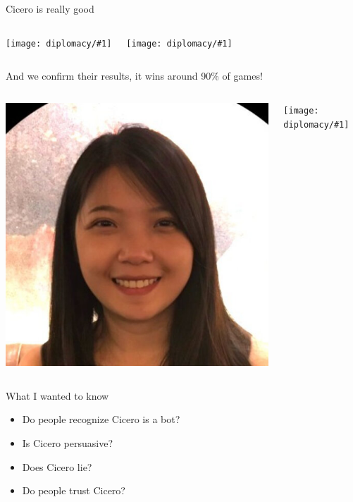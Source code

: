 \documentclass[compress]{beamer}
\newcommand{\gfxd}[2]{
	\begin{center}
		\texttt{[image: diplomacy/\#1]}
	\end{center}
}
\begin{document}

\begin{frame}{Cicero is really good}
	\begin{columns}
		\gfxd{cicero_model}{1.0}
		\gfxd{cicero_results}{1.0}
	\end{columns}
	And we confirm their results, it wins around 90\% of games!
\end{frame}

\begin{frame}{}
	\begin{columns}
		\column{.5\linewidth}
		\includegraphics[width=1.0\linewidth]{general_figures/joy}
		\column{.5\linewidth}
		\gfxd{benchmark_paper}{1.0}
	\end{columns}
\end{frame}

\begin{frame}{What I wanted to know}
	\begin{itemize}
		\item Do people recognize Cicero is a bot?
		\item Is Cicero persuasive?
		\item Does Cicero lie?
		\item Do people trust Cicero?
	\end{itemize}
\end{frame}
\end{document}

